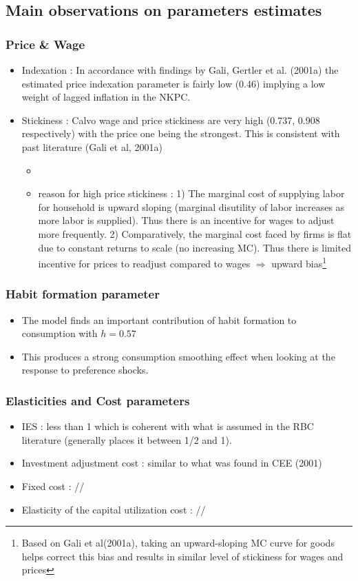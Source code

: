 \documentclass{article}
\begin{document}
\subsection{Main observations on parameters estimates }

\subsubsection{Price \& Wage }
\begin{itemize}
    \item Indexation : In accordance with findings by Gali, Gertler et al. (2001a)  the estimated price indexation parameter is fairly low (0.46) implying a low weight of lagged inflation in the NKPC. 
    \item Stickiness : Calvo wage and price stickiness are very high (0.737, 0.908 respectively) with the price one being the strongest. This is consistent with past literature (Gali et al, 2001a)
    \begin{itemize}
        \item 
        \item reason for high price stickiness :  1) The marginal cost of supplying labor for household is upward sloping (marginal disutility of labor increases as more labor is supplied). Thus there is an incentive for wages to adjust more frequently. 2) Comparatively, the marginal cost faced by firms is flat due to constant returns to scale (no increasing MC).  Thus there is limited incentive for prices to readjust compared to wages $\Longrightarrow$ upward bias\footnote{Based on Gali et al(2001a), taking an upward-sloping MC curve for goods helps correct this bias and results in similar level of stickiness for wages and prices}
    \end{itemize}
\end{itemize}

\subsubsection{Habit formation parameter}
\begin{itemize}
    \item The model finds an important contribution of habit formation to consumption with $h=0.57$
    \item This produces a strong consumption smoothing effect when looking at the response to preference shocks. 
\end{itemize}

\subsubsection{Elasticities and Cost parameters}
\begin{itemize}
    \item IES : less than 1 which is coherent with what is assumed in the RBC literature (generally places it between 1/2 and 1). 
    \item Investment adjustment cost : similar to what was found in CEE (2001)
    \item Fixed cost : //
    \item Elasticity of the capital utilization cost : //
\end{itemize}
\end{document}

